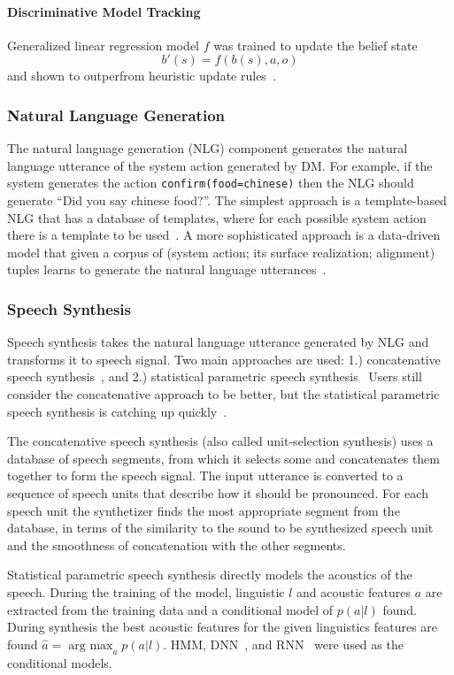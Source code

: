 \documentclass[10pt,twocolumn]{article}
\begin{document}
\paragraph*{Discriminative Model Tracking}
Generalized linear regression model $f$ was trained to update the belief state
$$b'(s)=f(b(s), a, o)$$
and shown to outperfrom heuristic update rules~\cite{bohus2006k}.

\subsubsection{Natural Language Generation}
The natural language generation (NLG) component generates the natural language utterance of the system action generated by DM. For example, if the system generates the action \texttt{confirm(food=chinese)} then the NLG should generate ``Did you say chinese food?''. The simplest approach is a template-based NLG that has a database of templates, where for each possible system action there is a template to be used~\cite{duvsek2014alex}. A more sophisticated approach is a data-driven model that given a corpus of (system action; its surface realization; alignment) tuples learns to generate the natural language utterances~\cite{mairesse2010phrase}.

\subsubsection{Speech Synthesis}
Speech synthesis takes the natural language utterance generated by NLG and transforms it to speech signal. Two main approaches are used: 1.) concatenative speech synthesis~\cite{campbell1997prosody,masuko1996speech}, and 2.) statistical parametric speech synthesis~\cite{zen2009statistical} Users still consider the concatenative approach to be better, but the statistical parametric speech synthesis is catching up quickly~\cite{zen2009statistical}.

The concatenative speech synthesis (also called unit-selection synthesis) uses a database of speech segments, from which it selects some and concatenates them together to form the speech signal. The input utterance is converted to a sequence of speech units that describe how it should be pronounced. For each speech unit the synthetizer finds the most appropriate segment from the database, in terms of the similarity to the sound to be synthesized speech unit and the smoothness of concatenation with the other segments.

Statistical parametric speech synthesis directly models the acoustics of the speech. During the training of the model, linguistic $l$ and acoustic features $a$ are extracted from the training data and a conditional model of $p(a|l)$ found. During synthesis the best acoustic features for the given linguistics features are found $\hat{a}=\operatorname{arg~max}_a p(a|l)$. HMM\cite{yoshimuray1999simultaneous}, DNN~\cite{ze2013statistical}, and RNN~\cite{zen2015unidirectional} were used as the conditional models.
\end{document}
